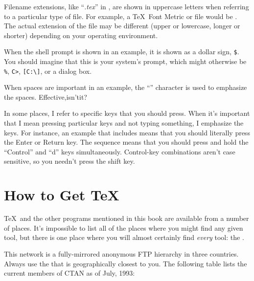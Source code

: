 Filename extensions, like ``\textit{.tex}'' in , are shown
in uppercase letters when referring to a particular type of file. For example,
a \TeX\ Font Metric or  file would be . The
actual extension of the file may be different (upper or lowercase, longer or
shorter) depending on your operating environment.

When the shell prompt is shown in an example, it is shown as a dollar sign,
{\tt\$}.  You should imagine that this is your system's
prompt, which might otherwise be \verb|%|, \verb|C>|,
\verb|[C:\]|, or a dialog box.

When spaces are important in an example, the ``{\ttspace}'' character is used
to emphasize the spaces.  Effective,\ttspace isn't\ttspace it?

In some places, I refer to specific keys that you should press.  When it's
important that I mean pressing particular keys and not typing something, I
emphasize the keys.  For instance, an example that includes  means
that you should literally press the Enter or Return key.  The sequence
 means that you should press and hold the ``Control'' and ``d''
keys simultaneously.  Control-key combinations aren't case sensitive, so you
needn't press the shift key.


\section{How to Get \protect\TeX}

\TeX\ and the other programs mentioned in this book are available from a
number of places.  It's impossible to list all of the places where you might
find any given tool, but there is one place where you will almost certainly
find {\em every\/} tool: the .

This network is a fully-mirrored anonymous FTP hierarchy in three countries.
Always use the  that is geographically closest
to you.  The following table lists the current members of CTAN as of
July, 1993:

